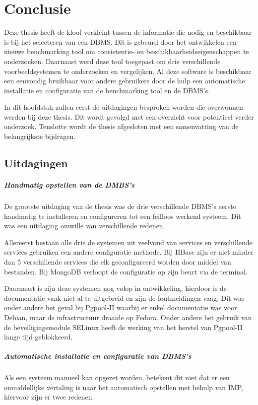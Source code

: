\chapter{Conclusie}\label{sec:conclusie}
Deze thesis heeft de kloof verkleint tussen de informatie die nodig en beschikbaar is bij het selecteren van een DBMS. Dit is gebeurd door het ontwikkelen een nieuwe benchmarking tool om consistentie- en beschikbaarheidseigenschappen te onderzoeken. Daarnaast werd deze tool toegepast om drie verschillende voorbeeldsystemen te onderzoeken en vergelijken. Al deze software is beschikbaar een eenvoudig bruikbaar voor andere gebruikers door de hulp een automatische installatie en configuratie van de benchmarking tool en de DBMS's. 

In dit hoofdstuk zullen eerst de uitdagingen besproken worden die overwonnen werden bij deze thesis. Dit wordt gevolgd met een overzicht voor potentieel verder onderzoek. Tenslotte wordt de thesis afgesloten met een samenvatting van de belangrijkste bijdragen. 

\section{Uitdagingen}
\paragraph{Handmatig opstellen van de DMBS's} De grootste uitdaging van de thesis was de drie verschillende DBMS's eerste handmatig te installeren en configureren tot een feilloos werkend systeem. Dit was een uitdaging omwille van verschillende redenen. 

Allereerst bestaan alle drie de systemen uit veelvoud van services en verschillende services gebruiken een andere configuratie methode. Bij HBase zijn er niet minder dan 5 verschillende services die elk geconfigureerd worden door middel van bestanden. Bij MongoDB verloopt de configuratie op zijn beurt via de terminal. 

Daarnaast is zijn deze systemen nog volop in ontwikkeling, hierdoor is de documentatie vaak niet al te uitgebreid en zijn de foutmeldingen vaag. Dit was onder andere het geval bij Pgpool-II waarbij er enkel documentatie was voor Debian, maar de infrastructuur draaide op Fedora. Onder andere het gebruik van de beveiligingsmodule SELinux heeft de werking van het herstel van Pgpool-II lange tijd geblokkeerd. 

\paragraph{Automatische installatie en configuratie van DBMS's} Als een systeem manueel kan opgezet worden, betekent dit niet dat er een onmiddellijke vertaling is naar het automatisch opstellen met behulp van IMP, hiervoor zijn er twee redenen. 

